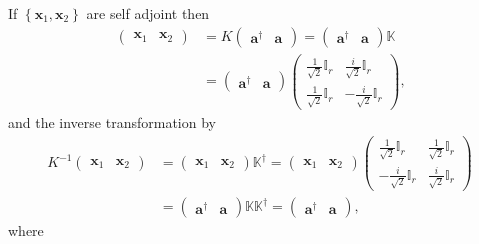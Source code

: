 \documentclass[aps, preprint]{revtex4}
\begin{document}
If $\left \{\mathbf{x}_{1} ,\mathbf{x}_{2}\right \}$ are self adjoint then
\begin{align}\left (\begin{array}{cc}\mathbf{x}_{1} & \mathbf{x}_{2}\end{array}\right ) &  =K \left (\begin{array}{cc}\mathbf{a}^{ \dag } & \mathbf{a}\end{array}\right ) =\left (\begin{array}{cc}\mathbf{a}^{ \dag } & \mathbf{a}\end{array}\right ) \mathbb{K} \\
 &  =\left (\begin{array}{cc}\mathbf{a}^{ \dag } & \mathbf{a}\end{array}\right ) \left (\begin{array}{cc}\frac{1}{\sqrt{2}} \mathbb{I}_{r} & \frac{i}{\sqrt{2}} \mathbb{I}_{r} \\
\frac{1}{\sqrt{2}} \mathbb{I}_{r} &  -\frac{i}{\sqrt{2}} \mathbb{I}_{r}\end{array}\right )\text{,}\end{align}and the inverse transformation by
\begin{align}K^{ -1} \left (\begin{array}{cc}\mathbf{x}_{1} & \mathbf{x}_{2}\end{array}\right ) &  =\left (\begin{array}{cc}\mathbf{x}_{1} & \mathbf{x}_{2}\end{array}\right ) \mathbb{K}^{ \dag } =\left (\begin{array}{cc}\mathbf{x}_{1} & \mathbf{x}_{2}\end{array}\right ) \left (\begin{array}{cc}\frac{1}{\sqrt{2}} \mathbb{I}_{r} & \frac{1}{\sqrt{2}} \mathbb{I}_{r} \\
 -\frac{i}{\sqrt{2}} \mathbb{I}_{r} & \frac{i}{\sqrt{2}} \mathbb{I}_{r}\end{array}\right ) \\
 &  =\left (\begin{array}{cc}\mathbf{a}^{ \dag } & \mathbf{a}\end{array}\right ) \mathbb{K} \mathbb{K}^{ \dag } =\left (\begin{array}{cc}\mathbf{a}^{ \dag } & \mathbf{a}\end{array}\right )\text{,}\end{align}where 
\end{document}
